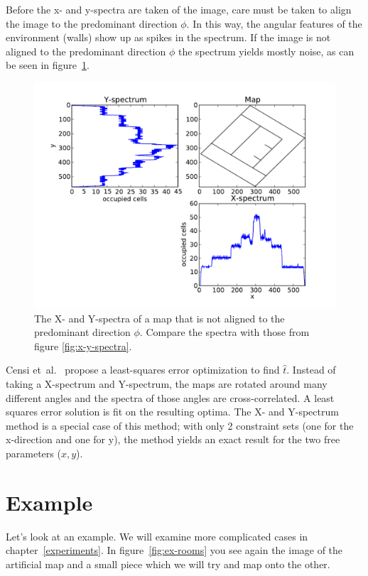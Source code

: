Before the x- and y-spectra are taken of the image, care must be taken to align the image to the predominant direction $\phi$. In this way, the angular features of the environment (walls) show up as spikes in the spectrum. If the image is not aligned to the predominant direction $\phi$ the spectrum yields mostly noise, as can be seen in figure~\ref{fig:x-y-spectra-noise}.

\begin{figure}[ht]
	\centering
	\includegraphics[width=\textwidth]{images/stitching/rooms-rotated-full-xy.pdf}
	\caption{The X- and Y-spectra of a map that is not aligned to the predominant direction $\phi$. Compare the spectra with those from figure \ref{fig:x-y-spectra}.}
	\label{fig:x-y-spectra-noise}
\end{figure}

Censi et~al.\ \cite{censi2005scan} propose a least-squares error optimization to find $\hat t$. Instead of taking a X-spectrum and Y-spectrum, the maps are rotated around many different angles and the spectra of those angles are cross-correlated. A least squares error solution is fit on the resulting optima. The X- and Y-spectrum method is a special case of this method; with only 2 constraint sets (one for the x-direction and one for y), the method yields an exact result for the two free parameters ($x, y$).

\section{Example}
Let's look at an example. We will examine more complicated cases in chapter~\ref{experiments}. In figure~\ref{fig:ex-rooms} you see again the image of the artificial map and a small piece which we will try and map onto the other. 

